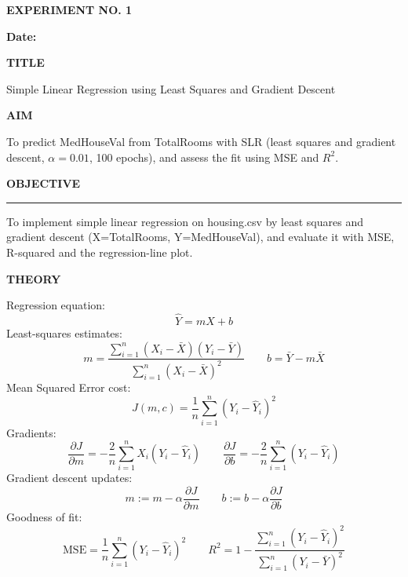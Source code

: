 \documentclass[11pt,twoside]{article}
\newcommand{\expheading}[1]{{\fontsize{14}{17}\selectfont\textbf{#1}\par}}
\newcommand{\fullrule}{\noindent\rule{\textwidth}{0.6pt}\par}
\begin{document}
{\setlength{\parskip}{1pt}\setlength{\abovedisplayskip}{2pt}\setlength{\belowdisplayskip}{2pt}
\begin{center}
\expheading{EXPERIMENT NO. 1}
\end{center}
\vspace{2pt}

\noindent\textbf{Date:} \underline{\hspace{2.6cm}}\par
\vspace{6pt}

\expheading{TITLE}
\vspace{4pt}
\noindent Simple Linear Regression using Least Squares and Gradient Descent\par
\vspace{4pt}

\expheading{AIM}
\vspace{4pt}
\noindent To predict MedHouseVal from TotalRooms with SLR (least squares and gradient descent, $\alpha=0.01$, 100 epochs), and assess the fit using MSE and $R^2$. \par
\vspace{4pt}

\expheading{OBJECTIVE}
\vspace{2pt}
\fullrule
\vspace{4pt}
\noindent To implement simple linear regression on housing.csv by least squares and gradient descent (X=TotalRooms, Y=MedHouseVal), and evaluate it with MSE, R-squared and the regression-line plot. \par
\vspace{4pt}

\expheading{THEORY}
\vspace{4pt}
Regression equation:
\[\hat{Y}=mX+b\]
Least-squares estimates:
\[m=\frac{\sum_{i=1}^{n}(X_i-\bar{X})(Y_i-\bar{Y})}{\sum_{i=1}^{n}(X_i-\bar{X})^2}\qquad b=\bar{Y}-m\bar{X}\]
Mean Squared Error cost:
\[J(m,c)=\frac{1}{n}\sum_{i=1}^{n}(Y_i-\hat{Y}_i)^2\]
Gradients:
\[\frac{\partial J}{\partial m}=-\frac{2}{n}\sum_{i=1}^{n}X_i(Y_i-\hat{Y}_i)\qquad \frac{\partial J}{\partial b}=-\frac{2}{n}\sum_{i=1}^{n}(Y_i-\hat{Y}_i)\]
Gradient descent updates:
\[m:=m-\alpha\frac{\partial J}{\partial m}\qquad b:=b-\alpha\frac{\partial J}{\partial b}\]
Goodness of fit:
\[\mathrm{MSE}=\frac{1}{n}\sum_{i=1}^{n}(Y_i-\hat{Y}_i)^2\qquad R^2=1-\frac{\sum_{i=1}^{n}(Y_i-\hat{Y}_i)^2}{\sum_{i=1}^{n}(Y_i-\bar{Y})^2}\]
\vspace{4pt}

}
\end{document}
